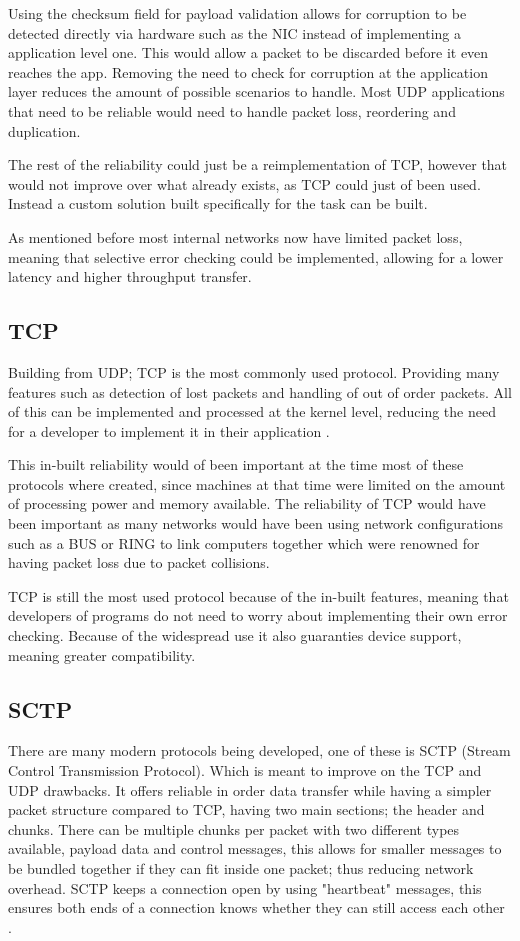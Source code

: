 Using the checksum field for payload validation allows for corruption to be detected directly via hardware such as the NIC instead of implementing a application level one. This would allow a packet to be discarded before it even reaches the app. Removing the need to check for corruption at the application layer reduces the amount of possible scenarios to handle. Most UDP applications that need to be reliable would need to handle packet loss, reordering and duplication.

The rest of the reliability could just be a reimplementation of TCP, however that would not improve over what already exists, as TCP could just of been used. Instead a custom solution built specifically for the task can be built.

As mentioned before most internal networks now have limited packet loss, meaning that selective error checking could be implemented, allowing for a lower latency and higher throughput transfer.

\subsection*{TCP}
Building from UDP; TCP is the most commonly used protocol. Providing many features such as detection of lost packets and handling of out of order packets. All of this can be implemented and processed at the kernel level, reducing the need for a developer to implement it in their application \parencite{tcp-rfc793}.

This in-built reliability would of been important at the time most of these protocols where created, since machines at that time were limited on the amount of processing power and memory available. The reliability of TCP would have been important as many networks would have been using network configurations such as a BUS or RING to link computers together which were renowned for having packet loss due to packet collisions.

TCP is still the most used protocol because of the in-built features, meaning that developers of programs do not need to worry about implementing their own error checking. Because of the widespread use it also guaranties device support, meaning greater compatibility.

\subsection*{SCTP}
There are many modern protocols being developed, one of these is SCTP (Stream Control Transmission Protocol). Which is meant to improve on the TCP and UDP drawbacks. It offers reliable in order data transfer while having a simpler packet structure compared to TCP, having two main sections; the header and chunks. There can be multiple chunks per packet with two different types available, payload data and control messages, this allows for smaller messages to be bundled together if they can fit inside one packet; thus reducing network overhead. SCTP keeps a connection open by using "heartbeat" messages, this ensures both ends of a connection knows whether they can still access each other \parencite{sctp-rfc9260}.


